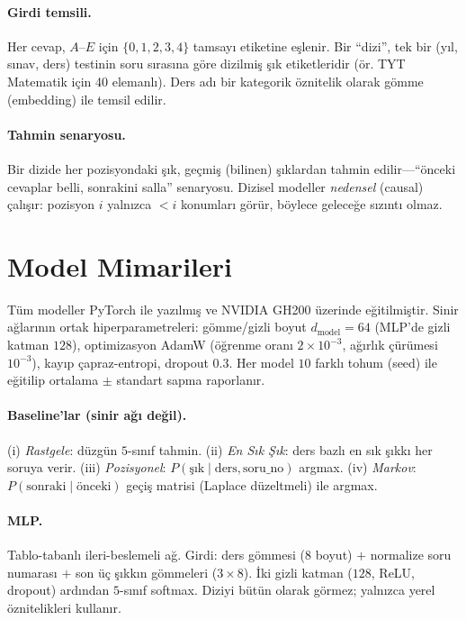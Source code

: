 \documentclass[11pt]{article}
\begin{document}
\paragraph{Girdi temsili.} Her cevap, $A$--$E$ için $\{0,1,2,3,4\}$ tamsayı
etiketine eşlenir. Bir ``dizi'', tek bir (yıl, sınav, ders) testinin soru
sırasına göre dizilmiş şık etiketleridir (ör. TYT Matematik için 40 elemanlı).
Ders adı bir kategorik öznitelik olarak gömme (embedding) ile temsil edilir.

\paragraph{Tahmin senaryosu.} Bir dizide her pozisyondaki şık, geçmiş (bilinen)
şıklardan tahmin edilir---``önceki cevaplar belli, sonrakini salla'' senaryosu.
Dizisel modeller \emph{nedensel} (causal) çalışır: pozisyon $i$ yalnızca
$<i$ konumları görür, böylece geleceğe sızıntı olmaz.

\section{Model Mimarileri}
Tüm modeller PyTorch ile yazılmış ve NVIDIA GH200 üzerinde eğitilmiştir.
Sinir ağlarının ortak hiperparametreleri: gömme/gizli boyut $d_{\text{model}}=64$
(MLP'de gizli katman $128$), optimizasyon AdamW (öğrenme oranı $2\times10^{-3}$,
ağırlık çürümesi $10^{-3}$), kayıp çapraz-entropi, dropout $0.3$. Her model
$10$ farklı tohum (seed) ile eğitilip ortalama $\pm$ standart sapma
raporlanır.

\paragraph{Baseline'lar (sinir ağı değil).} (i) \emph{Rastgele}: düzgün
$5$-sınıf tahmin. (ii) \emph{En Sık Şık}: ders bazlı en sık şıkkı her soruya
verir. (iii) \emph{Pozisyonel}: $P(\text{şık}\mid\text{ders}, \text{soru\_no})$
argmax. (iv) \emph{Markov}: $P(\text{sonraki}\mid\text{önceki})$ geçiş
matrisi (Laplace düzeltmeli) ile argmax.

\paragraph{MLP.} Tablo-tabanlı ileri-beslemeli ağ. Girdi: ders gömmesi
($8$ boyut) $+$ normalize soru numarası $+$ son üç şıkkın gömmeleri
($3\times 8$). İki gizli katman ($128$, ReLU, dropout) ardından $5$-sınıf
softmax. Diziyi bütün olarak görmez; yalnızca yerel öznitelikleri kullanır.
\end{document}
